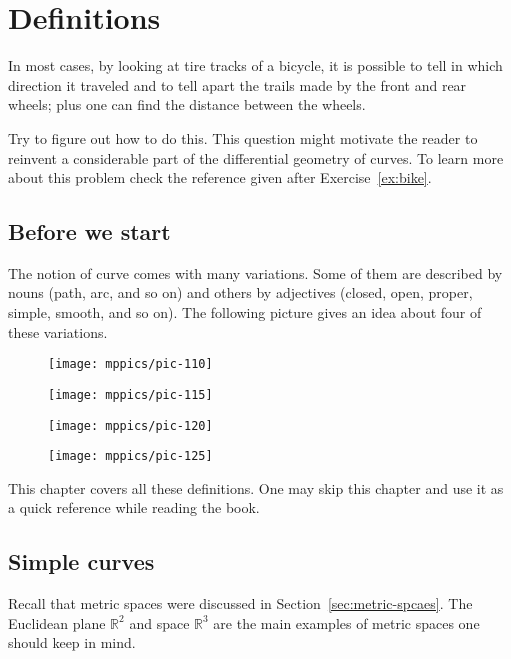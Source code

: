 \chapter{Definitions}
\label{chap:curves-def}

In most cases, by looking at tire tracks of a bicycle,
it is possible to tell in which direction it traveled and to tell apart the trails made by the front and rear wheels;
plus one can find the distance between the wheels.

Try to figure out how to do this.
This question might motivate the reader to reinvent a considerable part of the differential geometry of curves.
To learn more about this problem check the reference given after Exercise~\ref{ex:bike}.

\section{Before we start}

The notion of curve comes with many variations.
Some of them are described by nouns (path, arc, and so on) and  
others by adjectives (closed, open, proper, simple, smooth, and so on).
The following picture gives an idea about four of these variations.

\vskip-0mm
\begin{figure}[h!]
\begin{minipage}{.48\textwidth}
\centering
\texttt{[image: mppics/pic-110]}
\end{minipage}\hfill
\begin{minipage}{.48\textwidth}
\centering
\texttt{[image: mppics/pic-115]}
\end{minipage}
\bigskip
\begin{minipage}{.48\textwidth}
\centering
\texttt{[image: mppics/pic-120]}
\end{minipage}\hfill
\begin{minipage}{.48\textwidth}
\centering
\texttt{[image: mppics/pic-125]}
\end{minipage}
\end{figure}
\vskip-0mm

This chapter covers all these definitions.
One may skip this chapter and use it as a quick reference while reading the book.

\section{Simple curves}

Recall that metric spaces were discussed in Section~\ref{sec:metric-spcaes}.
The Euclidean plane $\mathbb{R}^2$ and space $\mathbb{R}^3$ are the main examples of metric spaces one should keep in mind.

